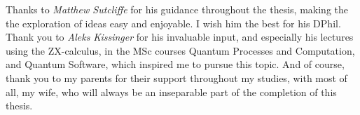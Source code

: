
Thanks to \textit{Matthew Sutcliffe} for his guidance throughout the thesis,
making the the exploration of ideas easy and enjoyable.
I wish him the best for his DPhil.
Thank you to \textit{Aleks Kissinger} for his invaluable input, 
and especially his lectures using the ZX-calculus,
in the MSc courses Quantum Processes and Computation, and Quantum Software,
which inspired me to pursue this topic.
And of course, thank you to my parents for their support throughout my studies,
with most of all, my wife, who will always be an inseparable part of the completion of this thesis.
